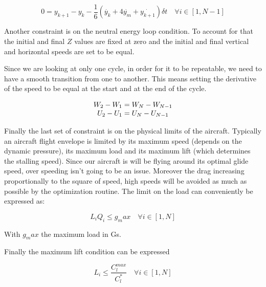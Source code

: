 \begin{equation}
  0=y_{k+1} - y_k - \frac{1}{6}( \dot{y_k} + 4 \dot{y_m} + \dot{y_{k+1}})\delta t \quad \forall i \in [1,N-1]
  \label{eqn:simpson}
\end{equation}

\par Another constraint is on the neutral energy loop condition.
To account for that the initial and final $Z$ values are fixed at zero and the initial and final vertical and horizontal speeds are set to be equal.

\par Since we are looking at only one cycle, in order for it to be repeatable, we need to have a smooth transition from one to another.
This  means setting the derivative of the speed to be equal at the start and at the end of the cycle.

\begin{equation}
  \begin{array}[c]{c}
    W_2 - W_1 = W_N - W_{N-1} \\
    U_2 - U_1 = U_N - U_{N-1} 
  \end{array}
  \label{eqn:derivative_constraint}
\end{equation}

\par Finally the last set of constraint is on the physical limits of the aircraft.
Typically an aircraft flight envelope is limited by its maximum speed (depends on the dynamic pressure), its maximum load and its maximum lift (which determines the stalling speed).
Since our aircraft is will be flying around its optimal glide speed, over speeding isn't going to be an issue.
Moreover the drag increasing proportionally to the square of speed, high speeds will be avoided as much as possible by the optimization routine.
The limit on the load can conveniently be expressed as:

\begin{equation}
  L_i Q_i \leq g_max \quad \forall i \in [1,N]
  \label{eqn:load_constraint}
\end{equation}

With $g_max$ the maximum load in Gs.


\par Finally the maximum lift condition can be expressed

\begin{equation}
  L_i \le \frac{C_l^{max}}{C_l^*} \quad \forall i \in [1,N]
  \label{eqn:lift_constraint}
\end{equation}

